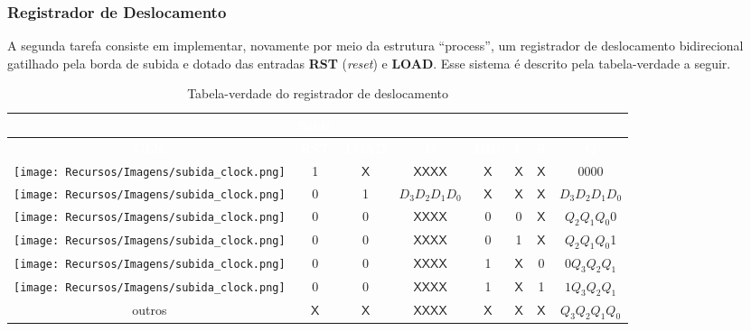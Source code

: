 \documentclass[a4paper,12pt]{article}
\begin{document}
\subsubsection{Registrador de Deslocamento}
A segunda tarefa consiste em implementar, novamente por meio da estrutura ``process'', um registrador de deslocamento bidirecional gatilhado pela borda de subida e dotado das entradas \textbf{RST} (\textit{reset}) e \textbf{LOAD}. Esse sistema é descrito pela tabela-verdade a seguir.

\begin{table}[H]
    \centering
    \footnotesize
    \begin{tabular}{|c|c|c|c|c|c|c|c|}
        \hline
        \rowcolor{black}
        \multicolumn{7}{|c|}{\textbf{\textcolor{white}{Entradas}}} & \textbf{\textcolor{white}{Saída}} \\ \hline
        \rowcolor{black}
        \textcolor{white}{\textbf{CLK}} & \textcolor{white}{\textbf{RST}} & \textcolor{white}{\textbf{LOAD}} & \textcolor{white}{\textbf{D}} & \textcolor{white}{\textbf{DIR}} & \textcolor{white}{\textbf{L}} & \textcolor{white}{\textbf{R}} & \textcolor{white}{\textbf{Q}} \\ \hline
        \texttt{[image: Recursos/Imagens/subida\_clock.png]} & 1 & $\mathsf{X}$ & $\mathsf{X} \mathsf{X}  \mathsf{X}  \mathsf{X} $ & $\mathsf{X}$ & $\mathsf{X}$ & $\mathsf{X}$ & 0000 \\ \hline
        \rowcolor{cinza}
        \texttt{[image: Recursos/Imagens/subida\_clock.png]} & 0 & 1 & $D_3D_2D_1D_0$ & $\mathsf{X}$ & $\mathsf{X}$ & $\mathsf{X}$ & $D_3D_2D_1D_0$ \\ \hline
        \texttt{[image: Recursos/Imagens/subida\_clock.png]} & 0 & 0 & $\mathsf{X} \mathsf{X}  \mathsf{X}  \mathsf{X} $ & 0 & 0 & $\mathsf{X}$ & $Q_2Q_1Q_0$0 \\ \hline
        \rowcolor{cinza}
        \texttt{[image: Recursos/Imagens/subida\_clock.png]} & 0 & 0 & $\mathsf{X} \mathsf{X}  \mathsf{X}  \mathsf{X} $ & 0 & 1 & $\mathsf{X}$ & $Q_2Q_1Q_0$1 \\ \hline
        \texttt{[image: Recursos/Imagens/subida\_clock.png]} & 0 & 0 & $\mathsf{X} \mathsf{X}  \mathsf{X}  \mathsf{X} $ & 1 & $\mathsf{X}$ & 0 & $0Q_3Q_2Q_1$ \\ \hline
        \rowcolor{cinza}
        \texttt{[image: Recursos/Imagens/subida\_clock.png]} & 0 & 0 & $\mathsf{X} \mathsf{X}  \mathsf{X}  \mathsf{X} $ & 1 & $\mathsf{X}$ & 1 & $1Q_3Q_2Q_1$ \\ \hline
        outros & $\mathsf{X}$ & $\mathsf{X}$ & $\mathsf{X} \mathsf{X}  \mathsf{X}  \mathsf{X} $ & $\mathsf{X}$ & $\mathsf{X}$ & $\mathsf{X}$ & $Q_3Q_2Q_1Q_0$ \\ \hline
    \end{tabular}
    \caption{Tabela-verdade do registrador de deslocamento}
    \label{tab:shift_register}
    \vspace{-5pt}
\end{table}
\end{document}
